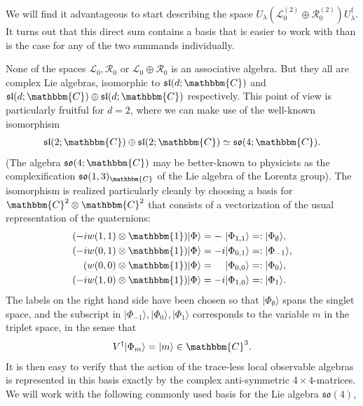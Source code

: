 \documentclass[aps,nofootinbib,floatfix,a4paper]{revtex4}
\newcommand{\1}{\mbox{$\mathbf{1}$}}
\def\CC{\mathbbm{C}}
\def\R{\mathcal{R}}
\def\Id{\mathbbm{1}}
\begin{document}
We will find it advantageous to start describing the space $U_\lambda(\mathcal{L}_0^{(2)}\oplus \R_0^{(2)}) U_\lambda^\dagger$.
It turns out that this direct sum contains a basis that is easier to work with than is the case for any of the two summands individually.

None of the spaces
$\mathcal{L}_0, \R_0$ 
or
$\mathcal{L}_0\oplus \R_0$ 
is an associative algebra.
But they all are complex Lie algebras, isomorphic to $\mathfrak{sl}(d; \CC)$ and 
$\mathfrak{sl}(d; \CC)\oplus\mathfrak{sl}(d; \CC)$ respectively.
This point of view is particularly fruitful for $d=2$, where we can make use of the well-known isomorphism
\begin{align}\label{eqn:qubit_lie}
	\mathfrak{sl}(2; \CC)\oplus\mathfrak{sl}(2; \CC)
	\simeq
	\mathfrak{so}(4; \CC).
\end{align}
(The algebra
$\mathfrak{so}(4;\CC)$ may be better-known to physicists as the complexification $\mathfrak{so}(1,3)_\CC$ of the Lie algebra of the Lorentz group).
The isomorphism is realized particularly cleanly by choosing a basis for $\CC^2\otimes\CC^2$ that consists of a vectorization of the usual representation of the quaternions:
\begin{align}
	\begin{split}\label{eqn:quaternio_vec}
		(-iw(1,1)\otimes\Id)|\Phi\rangle 
		&= -\phantom{i}|\Phi_{1,1}\rangle =: |\Phi_{\emptyset}\rangle,  \\
		(-iw(0,1)\otimes\Id)|\Phi\rangle
		&=-i|\Phi_{0,1}\rangle =: |\Phi_{-1}\rangle, \\
		(w(0,0)\otimes\Id)|\Phi\rangle
		&=\phantom{-i}|\Phi_{0,0}\rangle =: |\Phi_{0}\rangle, \\
		(-iw(1,0)\otimes\Id)|\Phi\rangle
		&=-i|\Phi_{1,0}\rangle =: |\Phi_{1}\rangle.
	\end{split}
\end{align}
The labels on the right hand side have been chosen so that $|\Phi_{\emptyset}\rangle$ spans the singlet space, and the subscript in $|\Phi_{-1}\rangle, |\Phi_{0}\rangle, |\Phi_{1}\rangle$ corresponds to the variable $m$ in the triplet space, in the sense that
\begin{align*}
	V^\dagger |\Phi_m\rangle = |m\rangle \in \CC^3.
\end{align*}
It is then easy to verify that the action of the trace-less local observable algebras is represented in this basis exactly by the complex anti-symmetric $4\times 4$-matrices.
We will work with the following commonly used basis for the Lie algebra $\mathfrak{so}(4)$,
\end{document}
